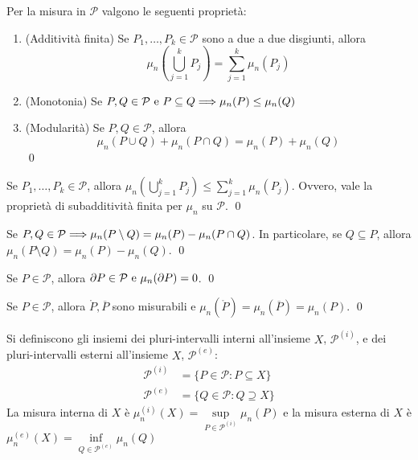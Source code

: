 \begin{theorem}
    Per la misura in $\mathcal{P}$ valgono le seguenti proprietà:
    \begin{enumerate}
        \item (Additività finita) Se $P_1,\dots,P_k \in \mathcal{P}$ sono a due a due disgiunti, allora
        \begin{equation*}
            \mu_n\left( \bigcup_{j=1}^k P_j \right) = \sum_{j=1}^k \mu_n(P_j)
        \end{equation*}
        \item (Monotonia) Se $P, Q \in \mathcal{P} \text{ e } P \subseteq Q \Longrightarrow \mu_n(P)\leq \mu_n(Q)$
        \item (Modularità) Se $P,Q \in \mathcal{P}$, allora
        \begin{equation*}
            \mu_n(P\cup Q) + \mu_n (P \cap Q) = \mu_n (P) + \mu_n (Q)
        \end{equation*}
        \qed
    \end{enumerate}
\end{theorem}

\begin{corollary}
    Se $P_1,\dots,P_k \in \mathcal{P}$, allora $\displaystyle \mu_n\left(\bigcup_{j=1}^kP_j\right) \leq \sum_{j=1}^k\mu_n(P_j)$. Ovvero, vale la proprietà di subadditività finita per $\mu_n$ su $\mathcal{P}$.
    \qed
\end{corollary}

\begin{corollary}
    Se $P,Q \in \mathcal{P} \Longrightarrow \mu_n(P\setminus Q)=\mu_n(P)-\mu_n(P\cap Q)$. In particolare, se $Q \subseteq P$, allora $\mu_n(P\setminus Q) = \mu_n (P)-\mu_n(Q)$.
    \qed
\end{corollary}

\begin{lemma}
    Se $P \in \mathcal{P}$, allora $\partial P \in \mathcal{P} \text{ e } \mu_n(\partial P)=0$.
    \qed
\end{lemma}

\begin{corollary}
    Se $P \in \mathcal{P}$, allora $\mathring P, \overline{P}$ sono misurabili e $\mu_n(\mathring P)=\mu_n(\overline{P})=\mu_n(P)$.
    \qed
\end{corollary}

\begin{definition}
    Si definiscono gli insiemi dei pluri-intervalli interni all'insieme $X$, $\mathcal{P}^{(i)}$, e dei pluri-intervalli esterni all'insieme $X$, $\mathcal{P}^{(e)}$:
    \begin{align*}
        \mathcal{P}^{(i)}&=\{P\in \mathcal{P}:P\subseteq X\}\\
        \mathcal{P}^{(e)}&=\{Q \in \mathcal{P}: Q \supseteq X \}
    \end{align*}
    La misura interna di $X$ è $
        \mu_n^{(i)}(X)=\sup\limits_{P\in \mathcal{P}^{(i)}}\mu_n(P)
    $
    e la misura esterna di $X$ è $
        \mu_n^{(e)}(X)=\inf\limits_{Q \in \mathcal{P}^{(e)}}\mu_n(Q)
    $
\end{definition}

